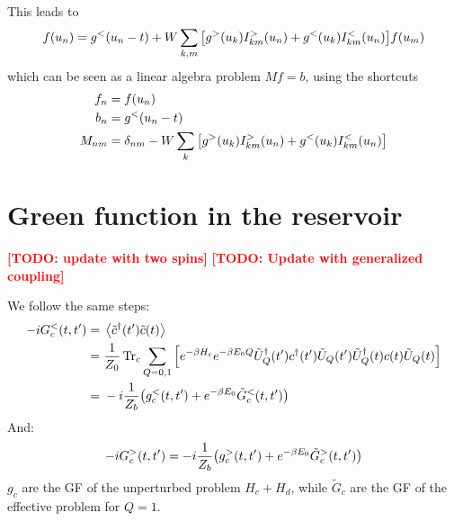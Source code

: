\documentclass[12pt]{article}
\newcommand\TODO[1]{\textcolor{red}{\textbf{[TODO: #1]}}}
\begin{document}
This leads to
\begin{equation}
	f(u_n) = g^<(u_n - t) + W \sum_{k,m} \qty[g^>(u_k) I^>_{km}(u_n) + g^<(u_k) I^<_{km}(u_n)] f(u_m)
\end{equation}
which can be seen as a linear algebra problem $M f = b$, using the shortcuts
\begin{align}
	f_n ={}& f(u_n)
	\\
	b_n ={}& g^<(u_n - t)
	\\
	M_{nm} ={}& \delta_{nm} - W \sum_k \qty[g^>(u_k) I^>_{km}(u_n) + g^<(u_k) I^<_{km}(u_n)]
\end{align}


\section{Green function in the reservoir}

\TODO{update with two spins}
\TODO{Update with generalized coupling}

We follow the same steps:
\begin{align}
	-i G^<_c(t, t') ={}& \expval{\tilde c^\dagger(t') \tilde c(t)}
	\\
	={}& \frac{1}{Z_0} \Tr_c \sum_{Q=0,1} \qty[e^{-\beta H_c} e^{-\beta E_0 Q} \tilde U_Q^\dagger(t') c^\dagger(t') \tilde U_Q(t') \tilde U_Q^\dagger(t) c(t) \tilde U_Q(t)]
	\\
	={}& -i \frac{1}{Z_b} \qty(g^<_c(t, t') + e^{-\beta E_0} \tilde G^<_c(t, t'))
\end{align}
And:
\begin{equation}
	-i G^>_c(t, t') = -i \frac{1}{Z_b} \qty(g^>_c(t, t') + e^{-\beta E_0} \tilde G^>_c(t, t'))
\end{equation}
$g_c$ are the \ac{GF} of the unperturbed problem $H_c + H_d$, while $\tilde G_c$ are the \ac{GF} of the effective problem for $Q=1$.




\end{document}
